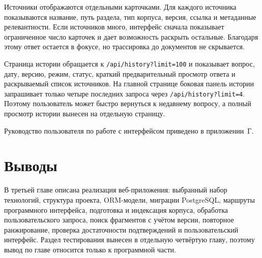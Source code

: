 Источники отображаются отдельными карточками. Для каждого источника показываются название, путь раздела, тип корпуса, версия, ссылка и метаданные релевантности. Если источников много, интерфейс сначала показывает ограниченное число карточек и дает возможность раскрыть остальные. Благодаря этому ответ остается в фокусе, но трассировка до документов не скрывается.

Страница истории обращается к \texttt{/api/history?limit=100} и показывает вопрос, дату, версию, режим, статус, краткий предварительный просмотр ответа и раскрываемый список источников. На главной странице боковая панель истории запрашивает только четыре последних запроса через \texttt{/api/history?limit=4}. Поэтому пользователь может быстро вернуться к недавнему вопросу, а полный просмотр истории вынесен на отдельную страницу.

Руководство пользователя по работе с интерфейсом приведено в приложении~Г.

\section{Выводы}

В третьей главе описана реализация веб-приложения: выбранный набор технологий, структура проекта, ORM-модели, миграции PostgreSQL, маршруты программного интерфейса, подготовка и индексация корпуса, обработка пользовательского запроса, поиск фрагментов с учётом версии, повторное ранжирование, проверка достаточности подтверждений и пользовательский интерфейс. Раздел тестирования вынесен в отдельную четвёртую главу, поэтому вывод по главе относится только к программной части.
